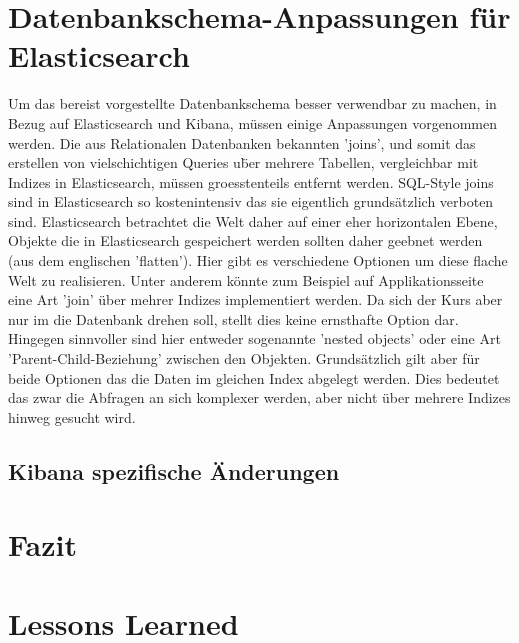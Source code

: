 \documentclass[twocolumn,10pt]{asme2ej}
\begin{document}
	\section{Datenbankschema-Anpassungen f\"ur Elasticsearch}
	Um das bereist vorgestellte Datenbankschema besser verwendbar zu machen, in Bezug auf Elasticsearch und Kibana, m\"ussen einige Anpassungen vorgenommen werden. Die aus Relationalen Datenbanken bekannten 'joins', und somit das erstellen von vielschichtigen Queries u\"ber mehrere Tabellen, vergleichbar mit Indizes in Elasticsearch, m\"ussen groesstenteils entfernt werden. SQL-Style joins sind in Elasticsearch so kostenintensiv das sie eigentlich grunds\"atzlich verboten sind\cite{esjoins}.
	Elasticsearch betrachtet die Welt daher auf einer eher horizontalen Ebene\cite{esDgFlatEarth}, Objekte die in Elasticsearch gespeichert werden sollten daher geebnet werden (aus dem englischen 'flatten'). \newline
	Hier gibt es verschiedene Optionen um diese flache Welt zu realisieren. Unter anderem k\"onnte zum Beispiel auf Applikationsseite eine Art 'join' \"uber mehrer Indizes implementiert werden. Da sich der Kurs aber nur im die Datenbank drehen soll, stellt dies keine ernsthafte Option dar. Hingegen sinnvoller sind hier entweder sogenannte 'nested objects' \cite{esDgNestedObjects} oder eine Art 'Parent-Child-Beziehung' zwischen den Objekten\cite{esDgParent-Child-Relationship}. Grunds\"atzlich gilt aber f\"ur beide Optionen das die Daten im gleichen Index abgelegt werden. Dies bedeutet das zwar die Abfragen an sich komplexer werden, aber nicht \"uber mehrere Indizes hinweg gesucht wird.
	\subsection{Kibana spezifische \"Anderungen}
	
	
	\section{Fazit}
	
	\section{Lessons Learned}

	
\end{document}
